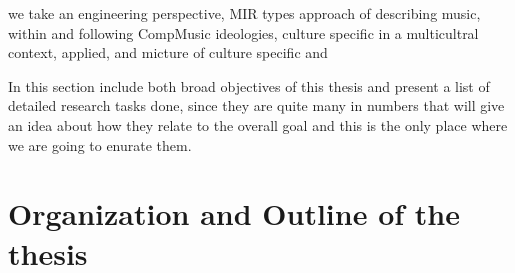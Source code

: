 we take an engineering perspective, MIR types approach of describing music, within and following CompMusic ideologies, culture specific in a multicultral context, applied, and micture of culture specific and 

In this section include both broad objectives of this thesis and present a list of detailed research tasks done, since they are quite many in numbers that will give an idea about how they relate to the overall goal and this is the only place where we are going to enurate them.

\section{Organization and Outline of the thesis}
\label{sec:intro_organization}
